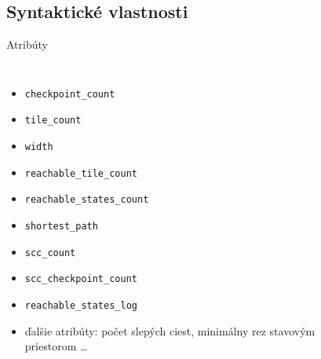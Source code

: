 \documentclass[xcolor={table}]{beamer}
\begin{document}
		\subsection{Syntaktické vlastnosti}
			\begin{frame}{Atribúty}
				\begin{columns}						
						\begin{itemize}%
						\item \texttt{checkpoint\_count}
						\item \texttt{tile\_count}
						\item \texttt{width}
						\item \texttt{reachable\_tile\_count}
						\item \texttt{reachable\_states\_count}
						\item \texttt{shortest\_path}
						\item \texttt{scc\_count}
						\item \texttt{scc\_checkpoint\_count}
						\item \texttt{reachable\_states\_log}
						\item ďalšie atribúty: \textcolor{bloodred}{počet slepých ciest, minimálny rez stavovým priestorom \ldots}
						\end{itemize}									
						\begin{figure}[h]
							\centering

\end{figure}
\end{columns}
\end{frame}
\end{document}
